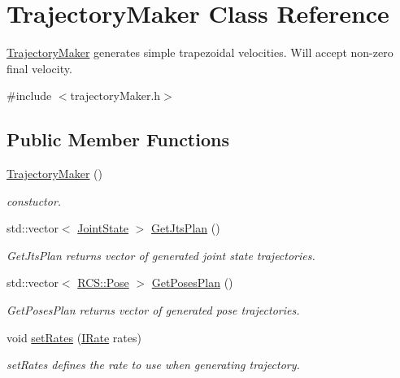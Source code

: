 \hypertarget{classTrajectoryMaker}{\section{Trajectory\-Maker Class Reference}
\label{classTrajectoryMaker}
}


\hyperlink{classTrajectoryMaker}{Trajectory\-Maker} generates simple trapezoidal velocities. Will accept non-\/zero final velocity.  




{\ttfamily \#include $<$trajectory\-Maker.\-h$>$}

\subsection*{Public Member Functions}
\begin{DoxyCompactItemize}
\item 
\hyperlink{classTrajectoryMaker_a6b767e7716eb5366d9b3bf70cf0ba9c6}{Trajectory\-Maker} ()
\begin{DoxyCompactList}\small\item\em constuctor. \end{DoxyCompactList}\item 
std\-::vector$<$ \hyperlink{RCS_8h_aa4adb93a26caa4dacba9c9614e283245}{Joint\-State} $>$ \hyperlink{classTrajectoryMaker_a5ec57242aa15a328e9aaaa200465901f}{Get\-Jts\-Plan} ()
\begin{DoxyCompactList}\small\item\em Get\-Jts\-Plan returns vector of generated joint state trajectories. \end{DoxyCompactList}\item 
std\-::vector$<$ \hyperlink{namespaceRCS_aa07e45d8a50e30064283d2b38087f999}{R\-C\-S\-::\-Pose} $>$ \hyperlink{classTrajectoryMaker_a073ea34d7bcbcd0a579dec4f8673701b}{Get\-Poses\-Plan} ()
\begin{DoxyCompactList}\small\item\em Get\-Poses\-Plan returns vector of generated pose trajectories. \end{DoxyCompactList}\item 
void \hyperlink{classTrajectoryMaker_ad752eac0a5705cab6620f5c9dad49654}{set\-Rates} (\hyperlink{classRCS_1_1IRate}{I\-Rate} rates)
\begin{DoxyCompactList}\small\item\em set\-Rates defines the rate to use when generating trajectory. \end{DoxyCompactList}\item 

\end{DoxyCompactItemize}
